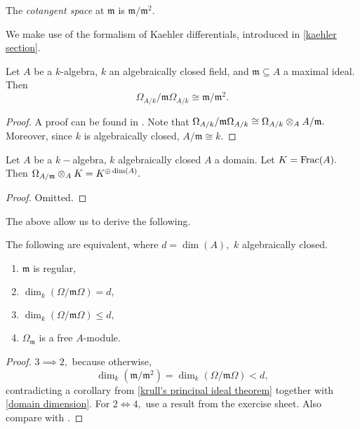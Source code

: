 
\begin{df}
  The \emph{cotangent space} at \(\mathfrak m\) is \(\mathfrak m / {\mathfrak m^2}.\)
\end{df}

We make use of the formalism of Kaehler differentials, introduced in \cref{kaehler section}.

\begin{lemma}
  \label{differentials and ideal quotient}
  Let \(A\) be a \(k\)-algebra, \(k\) an algebraically closed field, and \(\mathfrak m \subseteq A\) a maximal ideal. Then
  \[\Omega_{A/{k}} /{\mathfrak m \Omega_{A/{k}}} \cong \mathfrak m /{\mathfrak m^2}.\]
\end{lemma}
\begin{proof}
  A proof can be found in \cite[Proposition 8.7]{Hartshorne1977}. Note that \(\Omega_{A/{k}} /{\mathfrak{m} \Omega_{A/{k}}} \cong \Omega_{A/{k}} \otimes_A A/{\mathfrak{m}}.\) Moreover, since \(k\) is algebraically closed, \(A/{\mathfrak{m}} \cong k.\)
\end{proof}

\begin{lemma}
  Let \(A\) be a \(k-\)algebra, \(k\) algebraically closed \(A\) a domain. Let \(K = \mathrm{Frac}(A).\) Then
  \(\Omega_{A/{\mathfrak{m}}} \otimes_A K = K^{\oplus \dim(A)}.\)
\end{lemma}
\begin{proof}
  Omitted.
\end{proof}

The above allow us to derive the following.

\begin{prop}
  \label{prop omega}
  The following are equivalent, where \(d = \dim(A),\) \(k\) algebraically closed.
  \begin{enumerate}
  \item \(\mathfrak m\) is regular,
  \item \(\dim_k(\Omega /{\mathfrak m \Omega}) = d,\)
  \item \(\dim_k(\Omega / {\mathfrak m \Omega}) \leq d,\)
  \item \(\Omega_{\mathfrak m}\) is a free \(A\)-module.
  \end{enumerate}
\end{prop}
\begin{proof}
  \(3 \implies 2,\) because otherwise,
  \[\dim_k(\mathfrak m /{\mathfrak m^2}) = \dim_k(\Omega / {\mathfrak m \Omega}) < d,\]
  contradicting a corollary from \cref{krull's principal ideal theorem} together with \cref{domain dimension}.
  For \(2 \iff 4,\) use a result from the exercise sheet.
  Also compare with \cite[Theorem 8.8]{Hartshorne1977}.
\end{proof}

